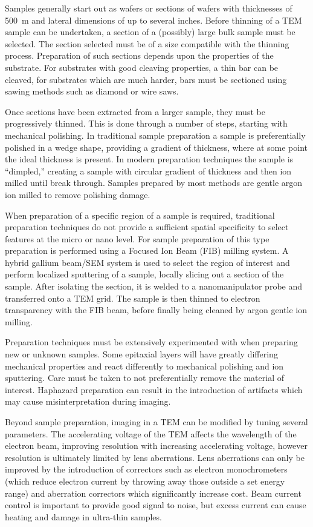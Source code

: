 Samples generally start out as wafers or sections of wafers with thicknesses of 500~\micro{}m and lateral dimensions of up to several inches.
Before thinning of a TEM sample can be undertaken, a section of a (possibly) large bulk sample must be selected.
The section selected must be of a size compatible with the thinning process.
Preparation of such sections depends upon the properties of the substrate.
For substrates with good cleaving properties, a thin bar can be cleaved, for substrates which are much harder, bars must be sectioned using sawing methods such as diamond or wire saws.

Once sections have been extracted from a larger sample, they must be progressively thinned.
This is done through a number of steps, starting with mechanical polishing.
In traditional sample preparation a sample is preferentially polished in a wedge shape, providing a gradient of thickness, where at some point the ideal thickness is present.
In modern preparation techniques the sample is ``dimpled,'' creating a sample with circular gradient of thickness and then ion milled until break through.
Samples prepared by most methods are gentle argon ion milled to remove polishing damage.

When preparation of a specific region of a sample is required, traditional preparation techniques do not provide a sufficient spatial specificity to select features at the micro or nano level.
For sample preparation of this type preparation is performed using a Focused Ion Beam (FIB) milling system.
A hybrid gallium beam/SEM system is used to select the region of interest and perform localized sputtering of a sample, locally slicing out a section of the sample.
After isolating the section, it is welded to a nanomanipulator probe and transferred onto a TEM grid.
The sample is then thinned to electron transparency with the FIB beam, before finally being cleaned by argon gentle ion milling.

Preparation techniques must be extensively experimented with when preparing new or unknown samples.
Some epitaxial layers will have greatly differing mechanical properties and react differently to mechanical polishing and ion sputtering.
Care must be taken to not preferentially remove the material of interest.
Haphazard preparation can result in the introduction of artifacts which may cause misinterpretation during imaging.

Beyond sample preparation, imaging in a TEM can be modified by tuning several parameters.
The accelerating voltage of the TEM affects the wavelength of the electron beam, improving resolution with increasing accelerating voltage, however resolution is ultimately limited by lens aberrations.
Lens aberrations can only be improved by the introduction of correctors such as electron monochrometers (which reduce electron current by throwing away those outside a set energy range) and aberration correctors which significantly increase cost.
Beam current control is important to provide good signal to noise, but excess current can cause heating and damage in ultra-thin samples.

